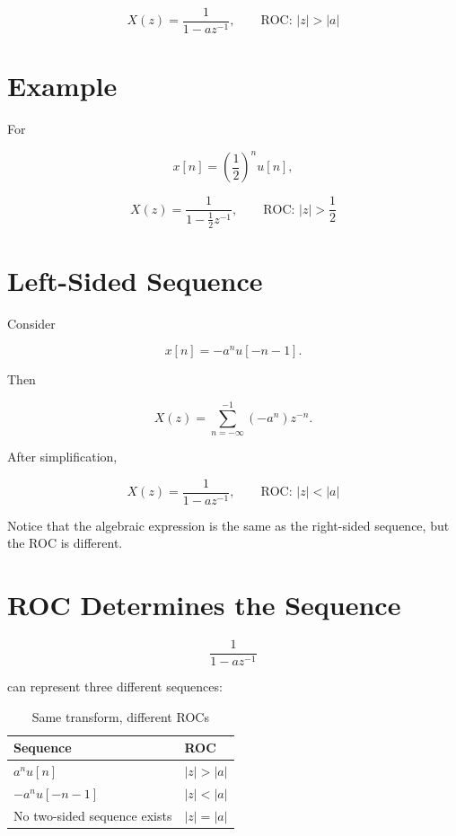 \[
\boxed{
X(z)=
\frac{1}{1-az^{-1}},
\qquad
\text{ROC: }|z|>|a|
}
\]


\section{Example}

For

\[
x[n]=\left(\frac12\right)^n u[n],
\]

\[
\boxed{
X(z)=
\frac{1}{1-\frac12 z^{-1}},
\qquad
\text{ROC: }|z|>\frac12
}
\]


\section{Left-Sided Sequence}

Consider

\[
x[n]=-a^n u[-n-1].
\]

Then

\[
X(z)=
\sum_{n=-\infty}^{-1}
(-a^n)z^{-n}.
\]

After simplification,

\[
\boxed{
X(z)=
\frac{1}{1-az^{-1}},
\qquad
\text{ROC: }|z|<|a|
}
\]

Notice that the algebraic expression is the same as the right-sided sequence, but
the ROC is different.


\section{ROC Determines the Sequence}

\[
\frac{1}{1-az^{-1}}
\]

can represent three different sequences:

\begin{table}[H]
\centering
\caption{Same transform, different ROCs}
\begin{tabular}{|p{5cm}|p{5cm}|}
\hline
\textbf{Sequence} & \textbf{ROC}\\
\hline
\(a^n u[n]\) & \(|z|>|a|\)\\
\hline
\(-a^n u[-n-1]\) & \(|z|<|a|\)\\
\hline
No two-sided sequence exists & \(|z|=|a|\)\\
\hline
\end{tabular}
\end{table}

